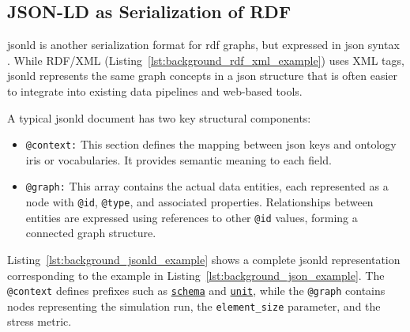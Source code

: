 \subsection{JSON-LD as Serialization of RDF}
\label{sec:background:jsonld}

\gls{jsonld} is another serialization format for \gls{rdf} graphs, but expressed in \gls{json} syntax \cite{jsonld2014}. While RDF/XML (Listing~\ref{lst:background_rdf_xml_example}) uses XML tags, \gls{jsonld} represents the same graph concepts in a \gls{json} structure that is often easier to integrate into existing data pipelines and web-based tools.

A typical \gls{jsonld} document has two key structural components:

\begin{itemize}
    \item \texttt{@context:} This section defines the mapping between \gls{json} keys and ontology \glspl{iri} or vocabularies. It provides semantic meaning to each field.
    \item \texttt{@graph:} This array contains the actual data entities, each represented as a node with \texttt{@id}, \texttt{@type}, and associated properties. Relationships between entities are expressed using references to other \texttt{@id} values, forming a connected graph structure.
\end{itemize}

Listing~\ref{lst:background_jsonld_example} shows a complete \gls{jsonld} representation corresponding to the example in Listing~\ref{lst:background_json_example}. The \texttt{@context} defines prefixes such as \href{https://schema.org/}{\texttt{schema}} and \href{https://qudt.org/vocab/unit}{\texttt{unit}}, while the \texttt{@graph} contains nodes representing the simulation run, the \texttt{element\_size} parameter, and the stress metric.

